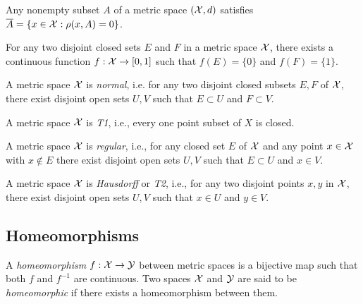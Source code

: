 \begin{lem}
  \label{lem:defineClosureFromDistance}
  Any nonempty subset $A$ of a metric space $({\cal X},d)$
  satisfies $\overline{A}=\{x\in{\cal X}: \rho(x,A)=0\}$.
\end{lem}

\begin{lem}
  \label{lem:separateClosedSets}
  For any two disjoint closed sets $E$ and $F$
  in a metric space ${\cal X}$,
  there exists a continuous function $f:{\cal X}\rightarrow [0,1]$
  such that $f(E)=\{0\}$ and $f(F)=\{1\}$.
\end{lem}

\begin{coro}
  \label{coro:metricSpaceIsNormal}
  A metric space ${\cal X}$ is \emph{normal},
  i.e.
  for any two disjoint closed subsets $E,F$ of ${\cal X}$,
  there exist disjoint open sets $U,V$
  such that $E\subset U$ and $F\subset V$.
\end{coro}

\begin{coro}
  \label{coro:metricSpaceIsT1}
  A metric space ${\cal X}$ is \emph{T1},
  i.e., every one point subset of $X$ is closed.
\end{coro}

\begin{coro}
  \label{coro:metricSpaceIsRegular}
  A metric space ${\cal X}$ is \emph{regular},
  i.e., 
  for any closed set $E$ of ${\cal X}$
  and any point $x\in{\cal X}$ with $x\not\in E$
  there exist disjoint open sets $U,V$
  such that $E\subset U$ and $x\in V$.
\end{coro}

\begin{coro}
  \label{coro:metricSpaceIsT2}
  A metric space ${\cal X}$ is \emph{Hausdorff} or \emph{T2},
  i.e., 
  for any two disjoint points $x,y$ in ${\cal X}$,
  there exist disjoint open sets $U,V$
  such that $x\in U$ and $y\in V$.
\end{coro}

\subsection{Homeomorphisms}
\label{sec:homeomorphisms}

\begin{defn}
  A \emph{homeomorphism} $f:{\cal X}\rightarrow {\cal Y}$
  between metric spaces
  is a bijective map such that both $f$ and $f^{-1}$
  are continuous.
  Two spaces ${\cal X}$ and ${\cal Y}$
  are said to be \emph{homeomorphic}
  if there exists a homeomorphism between them.
\end{defn}

